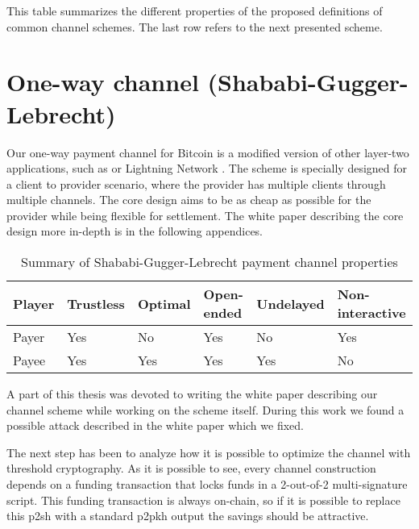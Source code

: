 This table summarizes the different properties of the proposed definitions of
common channel schemes. The last row refers to the next presented scheme.

\section{One-way channel (Shababi-Gugger-Lebrecht)}

Our one-way payment channel for Bitcoin is a modified version of other layer-two
applications, such as  or Lightning Network
\cite{poon2016bitcoin, YoursLightningProtocol}. The scheme is specially designed
for a client to provider scenario, where the provider has multiple clients
through multiple channels. The core design aims to be as cheap as possible for
the provider while being flexible for settlement. The white paper describing the
core design more in-depth is in the following appendices.

\begin{table}[h]
  \begin{tabularx}{\textwidth}{ | X | l | l | l | l | l |}
  \hline
  Player & Trustless & Optimal & Open-ended & Undelayed & Non-interactive \\ \hline \hline
  Payer & Yes & No & Yes & No & Yes \\ \hline
  Payee & Yes & Yes & Yes & Yes & No \\
  \hline
  \end{tabularx}
  \caption{Summary of Shababi-Gugger-Lebrecht payment channel properties}
  \label{fig:summaryShababiGuggerLebrechtPaymentChannel}
\end{table}

A part of this thesis was devoted to writing the white paper describing our
channel scheme while working on the scheme itself. During this work we found a
possible attack described in the white paper which we fixed.

The next step has been to analyze how it is possible to optimize the channel
with threshold cryptography. As it is possible to see, every channel
construction depends on a funding transaction that locks funds in a 2-out-of-2
multi-signature script. This funding transaction is always on-chain, so if it is
possible to replace this \gls{p2sh} with a standard \gls{p2pkh} output the savings
should be attractive.


